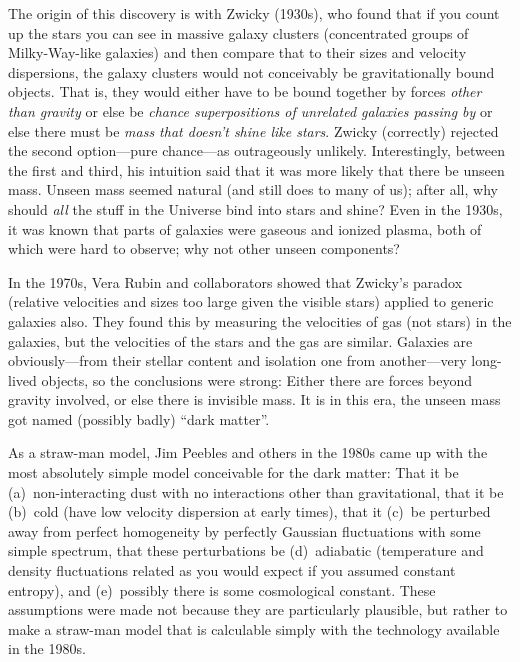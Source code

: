 \documentclass[12pt]{article}
\begin{document}
The origin of this discovery is with Zwicky (1930s), who found that if
you count up the stars you can see in massive galaxy clusters
(concentrated groups of Milky-Way-like galaxies) and then compare that
to their sizes and velocity dispersions, the galaxy clusters would not
conceivably be gravitationally bound objects.  That is, they would
either have to be bound together by forces \emph{other than gravity}
or else be \emph{chance superpositions of unrelated galaxies passing
  by} or else there must be \emph{mass that doesn't shine like stars}.
Zwicky (correctly) rejected the second option---pure chance---as
outrageously unlikely.  Interestingly, between the first and third,
his intuition said that it was more likely that there be unseen mass.
Unseen mass seemed natural (and still does to many of us); after all,
why should \emph{all} the stuff in the Universe bind into stars and
shine?  Even in the 1930s, it was known that parts of galaxies were
gaseous and ionized plasma, both of which were hard to observe; why
not other unseen components?

In the 1970s, Vera Rubin and collaborators showed that Zwicky's
paradox (relative velocities and sizes too large given the visible
stars) applied to generic galaxies also.  They found this by measuring
the velocities of gas (not stars) in the galaxies, but the velocities
of the stars and the gas are similar.  Galaxies are obviously---from
their stellar content and isolation one from another---very long-lived
objects, so the conclusions were strong: Either there are forces
beyond gravity involved, or else there is invisible mass.  It is in
this era, the unseen mass got named (possibly badly) ``dark matter''.

As a straw-man model, Jim Peebles and others in the 1980s came up with
the most absolutely simple model conceivable for the dark matter: That
it be (a)~non-interacting dust with no interactions other than
gravitational, that it be (b)~cold (have low velocity dispersion at
early times), that it (c)~be perturbed away from perfect homogeneity
by perfectly Gaussian fluctuations with some simple spectrum, that
these perturbations be (d)~adiabatic (temperature and density
fluctuations related as you would expect if you assumed constant
entropy), and (e)~possibly there is some cosmological constant.  These
assumptions were made not because they are particularly plausible, but
rather to make a straw-man model that is calculable simply with the
technology available in the 1980s.
\end{document}
